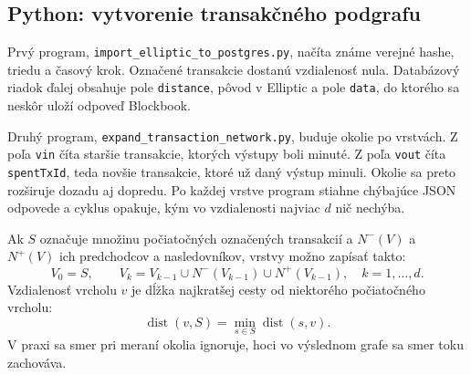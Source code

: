 \subsection{Python: vytvorenie transakčného podgrafu}

Prvý program, \texttt{import\_elliptic\_to\_postgres.py}, načíta známe
verejné hashe, triedu a časový krok. Označené transakcie dostanú
vzdialenosť nula. Databázový riadok ďalej obsahuje pole
\texttt{distance}, pôvod v Elliptic a pole \texttt{data}, do ktorého sa
neskôr uloží odpoveď Blockbook.

Druhý program, \texttt{expand\_transaction\_network.py}, buduje okolie
po vrstvách. Z poľa \texttt{vin} číta staršie transakcie, ktorých
výstupy boli minuté. Z poľa \texttt{vout} číta \texttt{spentTxId}, teda
novšie transakcie, ktoré už daný výstup minuli. Okolie sa preto
rozširuje dozadu aj dopredu. Po každej vrstve program stiahne chýbajúce
JSON odpovede a cyklus opakuje, kým vo vzdialenosti najviac $d$ nič
nechýba.

Ak $S$ označuje množinu počiatočných označených transakcií a
$N^{-}(V)$ a $N^{+}(V)$ ich predchodcov a nasledovníkov, vrstvy možno
zapísať takto:
\begin{equation}
  V_0=S,\qquad
  V_k=V_{k-1}\cup N^{-}(V_{k-1})\cup N^{+}(V_{k-1}),
  \quad k=1,\ldots,d.
  \label{eq:hop-expansion}
\end{equation}
Vzdialenosť vrcholu $v$ je dĺžka najkratšej cesty od niektorého
počiatočného vrcholu:
\begin{equation}
  \operatorname{dist}(v,S)=\min_{s\in S}\operatorname{dist}(s,v).
\end{equation}
V praxi sa smer pri meraní okolia ignoruje, hoci vo výslednom grafe sa
smer toku zachováva.

